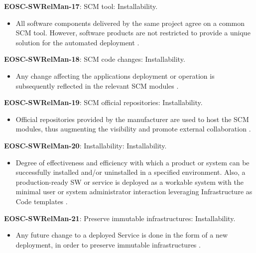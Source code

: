 \textbf{EOSC-SWRelMan-17}: SCM tool: Installability.

\begin{itemize}
    \item All software components delivered by the same project agree on a common SCM tool. However, software products are not restricted to provide a unique solution for the automated deployment \cite{orviz_set_2017}.
\end{itemize}

\textbf{EOSC-SWRelMan-18}: SCM code changes: Installability.

\begin{itemize}
    \item Any change affecting the applications deployment or operation is subsequently reflected in the relevant SCM modules \cite{orviz_set_2017}.
\end{itemize}

\textbf{EOSC-SWRelMan-19}: SCM official repositories: Installability.

\begin{itemize}
    \item Official repositories provided by the manufacturer are used to host the SCM modules, thus augmenting the visibility and promote external collaboration \cite{orviz_set_2017}.
\end{itemize}

\textbf{EOSC-SWRelMan-20}: Installability: Installability.

\begin{itemize}
    \item Degree of effectiveness and efficiency with which a product or system can be successfully installed and/or uninstalled in a specified environment. Also, a production-ready SW or service is deployed as a workable system with the minimal user or system administrator interaction leveraging Infrastructure as Code templates \cite{iso_25010_2011_2017,orviz_fernandez_eosc-synergy_2020}.
\end{itemize}

\textbf{EOSC-SWRelMan-21}: Preserve immutable infrastructures: Installability.

\begin{itemize}
    \item Any future change to a deployed Service is done in the form of a new deployment, in order to preserve immutable infrastructures \cite{orviz_fernandez_eosc-synergy_2020}.
\end{itemize}

